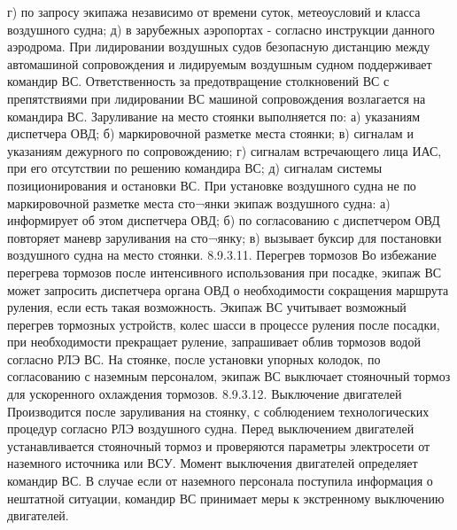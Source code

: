 г)	по запросу экипажа независимо от времени суток, метеоусловий и класса воздушного судна; 
д)	в зарубежных аэропортах - согласно инструкции данного аэродрома. 
При лидировании воздушных судов безопасную дистанцию между автомашиной сопровождения и лидируемым воздушным судном поддерживает командир ВС. 
Ответственность за предотвращение столкновений ВС с препятствиями при лидировании ВС машиной сопровождения возлагается на командира ВС. 
Заруливание на место стоянки выполняется по:
а)	указаниям диспетчера ОВД;
б)	маркировочной разметке места стоянки;
в)	сигналам и указаниям дежурного по сопровождению;
г)	сигналам встречающего лица ИАС, при его отсутствии по решению командира ВС;
д)	сигналам системы позиционирования и остановки ВС.
При установке воздушного судна не по маркировочной разметке места сто¬янки экипаж воздушного судна:
а)	информирует об этом диспетчера ОВД;
б)	по согласованию с диспетчером ОВД повторяет маневр заруливания на сто¬янку;
в)	вызывает буксир для постановки воздушного судна на место стоянки.
8.9.3.11.	Перегрев тормозов
Во избежание перегрева тормозов после интенсивного использования при посадке, экипаж ВС может запросить диспетчера органа ОВД о необходимости сокращения маршрута руления, если есть такая возможность. Экипаж ВС учитывает возможный перегрев тормозных устройств, колес шасси в процессе руления после посадки, при необходимости прекращает руление, запрашивает облив тормозов водой согласно РЛЭ ВС. 
На стоянке, после установки упорных колодок, по согласованию с наземным персоналом, экипаж ВС выключает стояночный тормоз для ускоренного охлаждения тормозов.
8.9.3.12.	Выключение двигателей
Производится после заруливания на стоянку, с соблюдением технологических процедур согласно РЛЭ воздушного судна. 
Перед выключением двигателей устанавливается стояночный тормоз и проверяются параметры электросети от наземного источника или ВСУ. Момент выключения двигателей определяет командир ВС. 
В случае если от наземного персонала поступила информация о нештатной ситуации, командир ВС принимает меры к экстренному выключению двигателей. 

